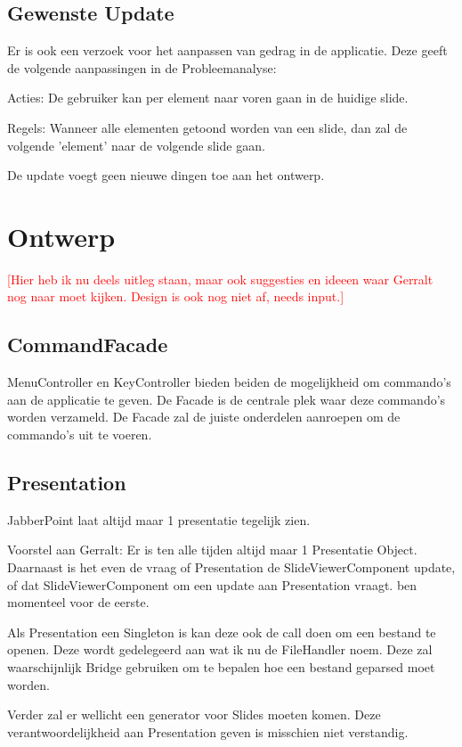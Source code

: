 \documentclass[a4paper]{article}
\newcommand{\todo}[1]{\textcolor{red}{[#1]}}
\begin{document}
\subsection{Gewenste Update}
Er is ook een verzoek voor het aanpassen van gedrag in de applicatie. Deze geeft
de volgende aanpassingen in de Probleemanalyse:

Acties: De gebruiker kan per element naar voren gaan in de huidige slide.

Regels: Wanneer alle elementen getoond worden van een slide, dan zal de volgende
'element' naar de volgende slide gaan.

De update voegt geen nieuwe dingen toe aan het ontwerp.

\section{Ontwerp}
\todo{Hier heb ik nu deels uitleg staan, maar ook suggesties en ideeen waar
Gerralt nog naar moet kijken. Design is ook nog niet af, needs input.}

\subsection{CommandFacade}
MenuController en KeyController bieden beiden de mogelijkheid om commando's aan
de applicatie te geven. De Facade is de centrale plek waar deze commando's
worden verzameld. De Facade zal de juiste onderdelen aanroepen om de commando's
uit te voeren.

\subsection{Presentation}
JabberPoint laat altijd maar 1 presentatie tegelijk zien.

Voorstel aan Gerralt: Er is ten alle tijden altijd maar 1 Presentatie Object.
Daarnaast is het even de vraag of Presentation de SlideViewerComponent update,
of dat SlideViewerComponent om een update aan Presentation vraagt. ben momenteel
voor de eerste.

Als Presentation een Singleton is kan deze ook de call doen om een bestand te
openen. Deze wordt gedelegeerd aan wat ik nu de FileHandler noem. Deze zal
waarschijnlijk Bridge gebruiken om te bepalen hoe een bestand geparsed moet
worden.

Verder zal er wellicht een generator voor Slides moeten komen. Deze
verantwoordelijkheid aan Presentation geven is misschien niet verstandig.
\end{document}
